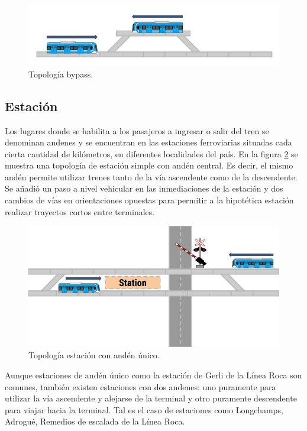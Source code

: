 		\begin{figure}[h]
		\centering
			\includegraphics[scale=.5]{./Figures/Bypass_2}
			\caption{Topología bypass.}
			\label{fig:Bypass}
		\end{figure}

	\vspace{5cm}
				
	\subsection{Estación}

		Los lugares donde se habilita a los pasajeros a ingresar o salir del tren se denominan andenes y se encuentran en las estaciones ferroviarias situadas cada cierta cantidad de kilómetros, en diferentes localidades del país. En la figura \ref{fig:Estacion} se muestra una topología de estación simple con andén central. Es decir, el mismo andén permite utilizar trenes tanto de la vía ascendente como de la descendente. Se añadió un paso a nivel vehicular en las inmediaciones de la estación y dos cambios de vías en orientaciones opuestas para permitir a la hipotética estación realizar trayectos cortos entre terminales.
		
			\begin{figure}[h]
			\centering
				\includegraphics[scale=.5]{./Figures/Estacion}
				\caption{Topología estación con andén único.}
				\label{fig:Estacion}
			\end{figure}
		
		Aunque estaciones de andén único como la estación de Gerli de la Línea Roca son comunes, también existen estaciones con dos andenes: uno puramente para utilizar la vía ascendente y alejarse de la terminal y otro puramente descendente para viajar hacia la terminal. Tal es el caso de estaciones como Longchamps, Adrogué, Remedios de escalada de la Línea Roca.

